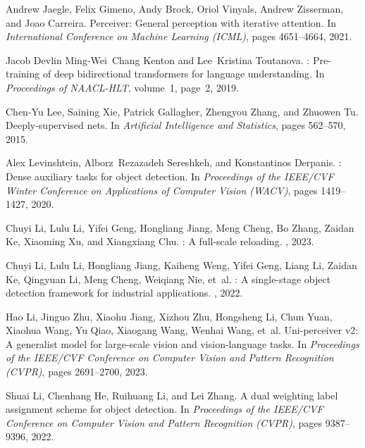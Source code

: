 \documentclass[10pt,twocolumn,letterpaper]{article}
\begin{document}
{\begin{thebibliography}{10}
		Andrew Jaegle, Felix Gimeno, Andy Brock, Oriol Vinyals, Andrew Zisserman, and
		Joao Carreira.
		\newblock Perceiver: General perception with iterative attention.
		\newblock In {\em International Conference on Machine Learning (ICML)}, pages
		4651--4664, 2021.
		
		Jacob Devlin Ming-Wei~Chang Kenton and Lee~Kristina Toutanova.
		: Pre-training of deep bidirectional transformers for language
		understanding.
		\newblock In {\em Proceedings of NAACL-HLT}, volume~1, page~2, 2019.
		
		Chen-Yu Lee, Saining Xie, Patrick Gallagher, Zhengyou Zhang, and Zhuowen Tu.
		\newblock Deeply-supervised nets.
		\newblock In {\em Artificial Intelligence and Statistics}, pages 562--570,
		2015.
		
		Alex Levinshtein, Alborz~Rezazadeh Sereshkeh, and Konstantinos Derpanis.
		: Dense auxiliary tasks for object detection.
		\newblock In {\em Proceedings of the IEEE/CVF Winter Conference on Applications
			of Computer Vision (WACV)}, pages 1419--1427, 2020.
		
		Chuyi Li, Lulu Li, Yifei Geng, Hongliang Jiang, Meng Cheng, Bo Zhang, Zaidan
		Ke, Xiaoming Xu, and Xiangxiang Chu.
		: A full-scale reloading.
		, 2023.
		
		Chuyi Li, Lulu Li, Hongliang Jiang, Kaiheng Weng, Yifei Geng, Liang Li, Zaidan
		Ke, Qingyuan Li, Meng Cheng, Weiqiang Nie, et~al.
		: A single-stage object detection framework for industrial
		applications.
		, 2022.
		
		Hao Li, Jinguo Zhu, Xiaohu Jiang, Xizhou Zhu, Hongsheng Li, Chun Yuan, Xiaohua
		Wang, Yu Qiao, Xiaogang Wang, Wenhai Wang, et~al.
		\newblock Uni-perceiver v2: A generalist model for large-scale vision and
		vision-language tasks.
		\newblock In {\em Proceedings of the IEEE/CVF Conference on Computer Vision and
			Pattern Recognition (CVPR)}, pages 2691--2700, 2023.
		
		Shuai Li, Chenhang He, Ruihuang Li, and Lei Zhang.
		\newblock A dual weighting label assignment scheme for object detection.
		\newblock In {\em Proceedings of the IEEE/CVF Conference on Computer Vision and
			Pattern Recognition (CVPR)}, pages 9387--9396, 2022.
		

\end{thebibliography}}
\end{document}
